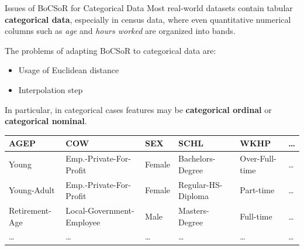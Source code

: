 \documentclass[10pt,aspectratio=169]{beamer}
\begin{document}
\begin{frame}{Issues of BoCSoR for Categorical Data}
  Most real-world datasets contain tabular \textbf{categorical data}, especially in census data, where even quantitative numerical columns such as \emph{age} and \emph{hours worked} are organized into bands.
  \medskip

  The problems of adapting BoCSoR to categorical data are:
  \begin{itemize}
    \item Usage of Euclidean distance
    \item Interpolation step
  \end{itemize}
  In particular, in categorical cases features may be \textbf{categorical ordinal} or \textbf{categorical nominal}.
  \medskip

  \centering
  \footnotesize
  \begin{tabular}{@{}llllll@{}}
    \toprule
    AGEP & COW & SEX & SCHL & WKHP & \ldots \\
    \midrule
    Young & Emp.-Private-For-Profit & Female & Bachelors-Degree & Over-Full-time & \ldots \\
    Young-Adult & Emp.-Private-For-Profit & Female & Regular-HS-Diploma & Part-time & \ldots \\
    Retirement-Age & Local-Government-Employee & Male   & Masters-Degree & Full-time & \ldots \\
    \ldots & \ldots & \ldots & \ldots & \ldots & \ldots \\
    \bottomrule
  \end{tabular}
\end{frame}
\end{document}
